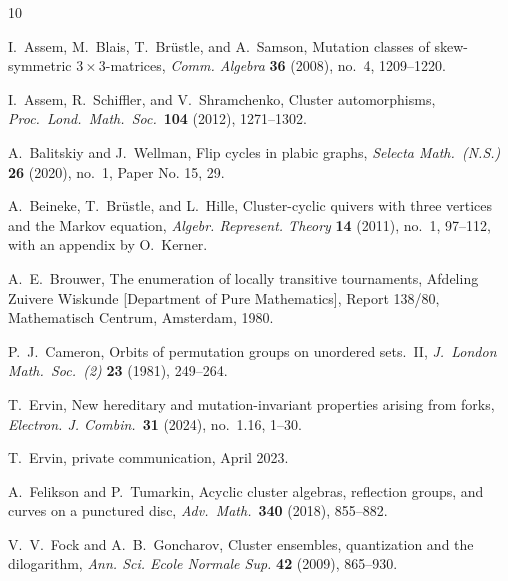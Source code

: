 \documentclass[11pt, letterpaper]{amsart}
\theoremstyle{definition}
\numberwithin{equation}{section}
\begin{document}
\providecommand{\bysame}{\leavevmode\hbox to3em{\hrulefill}\thinspace}
\providecommand{\MR}{\relax\ifhmode\unskip\space\fi MR }
\providecommand{\MRhref}[2]{%
  \href{http://www.ams.org/mathscinet-getitem?mr=#1}{#2}
}
\providecommand{\href}[2]{#2}
\begin{thebibliography}{10}


I.~Assem, M.~Blais, T.~Br\"{u}stle, and A.~Samson, %
Mutation classes of skew-symmetric {$3\times 3$}-matrices, 
\textsl{Comm. Algebra} \textbf{36} (2008), no.~4, 1209--1220. %

I.~Assem, R.~Schiffler, and V.~Shramchenko, 
Cluster automorphisms,
\textsl{Proc.\ Lond.\ Math.\ Soc.}\ \textbf{104} (2012), 1271--1302.

A.~Balitskiy and J.~Wellman, %
Flip cycles in plabic graphs,
\textsl{Selecta Math.\ (N.S.)} \textbf{26} (2020), no.~1, Paper No. 15, 29.

A.~Beineke, T.~Br\"{u}stle, and L.~Hille, %
Cluster-cyclic quivers with three vertices and the {M}arkov equation, 
\textsl{Algebr. Represent. Theory}
  \textbf{14} (2011), no.~1, 97--112, with an appendix by O.~Kerner.
  
A.~E.~Brouwer, 
The enumeration of locally transitive tournaments, 
Afdeling Zuivere Wiskunde [Department of Pure Mathematics], Report 138/80, 
Mathematisch Centrum, Amsterdam, 1980.

P.~J.~Cameron, 
Orbits of permutation groups on unordered sets.~II,  
\textsl{J.~London Math.\ Soc.\ (2)} \textbf{23} (1981), 249--264. 

T.~Ervin, 
New hereditary and mutation-invariant properties arising from forks,
\textsl{Electron. J. Combin.}\ \textbf{31} (2024), no.~1.16, 1--30.

T.~Ervin, private communication, April 2023. 

A.~Felikson and P.~Tumarkin, 
Acyclic cluster algebras, reflection groups, and curves on a punctured disc, 
\textsl{Adv.\ Math.}\ \textbf{340} (2018), 855--882. 

V.~V.~Fock and A.~B.~Goncharov, 
Cluster ensembles, quantization and the dilogarithm, 
\textsl{Ann. Sci. Ecole Normale Sup.} \textbf{42} 
(2009), 865--930.


\end{thebibliography}
\end{document}
